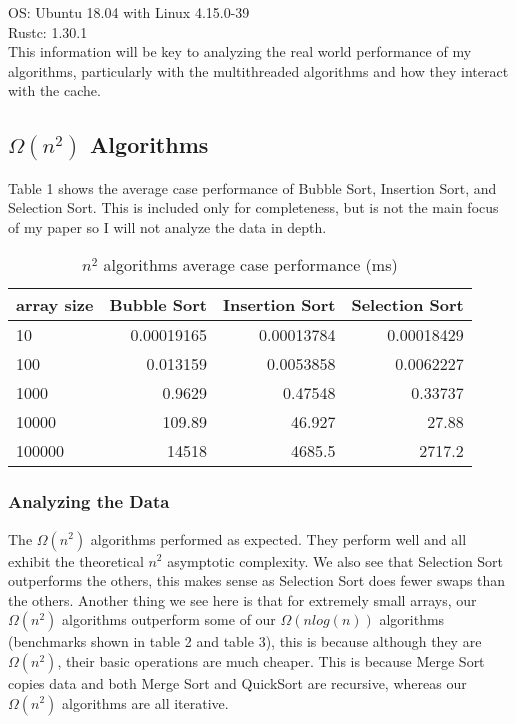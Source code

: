 \documentclass[12pt,letterpaper]{report}
\begin{document}
	OS: Ubuntu 18.04 with Linux 4.15.0-39\\
	
	Rustc: 1.30.1 \\
	
	This information will be key to analyzing the real world performance of my algorithms, particularly with the multithreaded algorithms and how they interact with the cache.
	
	\subsection*{$\Omega(n^2)$ Algorithms}
	
	Table 1 shows the average case performance of Bubble Sort, Insertion Sort, and Selection Sort. This is included only for completeness, but is not the main focus of my paper so I will not analyze the data in depth.
	
\begin{table}[h!]
  \begin{center}
    \caption{$n^2$ algorithms average case performance (ms)}
    \label{tab:table1}
    \begin{tabular}{l|r|r|r}
      \textbf{array size} & \textbf{Bubble Sort} & \textbf{Insertion Sort} & \textbf{Selection Sort}\\
      \hline
      10 & 0.00019165 & 0.00013784 & 0.00018429\\
      100 & 0.013159 & 0.0053858 & 0.0062227\\
      1000 & 0.9629 & 0.47548 & 0.33737\\
      10000 & 109.89 & 46.927 & 27.88\\
      100000 & 14518 & 4685.5 & 2717.2\\
    \end{tabular}
  \end{center}
\end{table}	

	\subsubsection{Analyzing the Data}

	The $\Omega(n^2)$ algorithms performed as expected. They perform well and all exhibit the theoretical $n^2$ asymptotic complexity. We also see that Selection Sort outperforms the others, this makes sense as Selection Sort does fewer swaps than the others. Another thing we see here is that for extremely small arrays, our $\Omega(n^2)$ algorithms outperform some of our $\Omega(nlog(n))$ algorithms (benchmarks shown in table 2 and table 3), this is because although they are $\Omega(n^2)$, their basic operations are much cheaper. This is because Merge Sort copies data and both Merge Sort and QuickSort are recursive, whereas our $\Omega(n^2)$ algorithms are all iterative.
	
\end{document}
